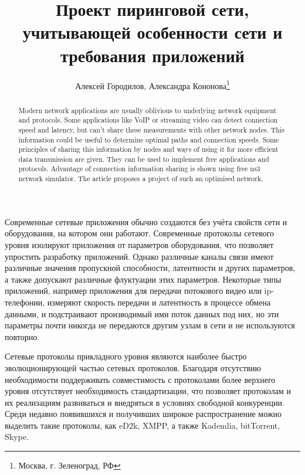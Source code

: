 \documentclass[10pt, a5paper]{article}
\begin{document}
\title{Проект пиринговой сети, учитывающей особенности сети и требования приложений}%

\author{Алексей Городилов, Александра Кононова\footnote{Москва, г. Зеленоград, РФ}}
\maketitle

\begin{abstract}
Modern network applications are usually oblivious to underlying network equipment and protocols. Some applications like VoIP or streaming video can detect connection speed and latency, but can't share these measurements with other network nodes. This information could be useful to determine optimal paths and connection speeds. Some principles of sharing this information by nodes and ways of using it for more efficient data transmission are given. They can be used to implement free applications and protocols. Advantage of connection information sharing is shown using free ns3 network simulator. The article proposes a project of such an optimised network.
\end{abstract}

Современные сетевые приложения обычно создаются без учёта свойств сети и оборудования, на котором они работают.  Современные протоколы сетевого уровня изолируют приложения от параметров оборудования, что позволяет упростить разработку приложений. Однако различные каналы связи имеют различные значения пропускной способности, латентности и других параметров, а также допускают различные флуктуации этих параметров. Некоторые типы приложений, например приложения для передачи потокового видео или ip-телефонии, измеряют скорость передачи и латентность в процессе обмена данными, и подстраивают производимый ими поток данных под них, но эти параметры почти никогда не передаются другим узлам в сети и не используются повторно.

Сетевые протоколы прикладного уровня являются наиболее быстро эволюционирующей частью сетевых протоколов. Благодаря отсутствию необходимости поддерживать совместимость с протоколами более верхнего уровня отсутствует необходимость стандартизации, что позволяет протоколам и их реализациям развиваться и внедряться в условиях свободной конкуренции. Среди недавно появившихся и получивших широкое распространение можно выделить такие протоколы, как eD2k, XMPP, а также Kademlia, bitTorrent, Skype.
\end{document}
